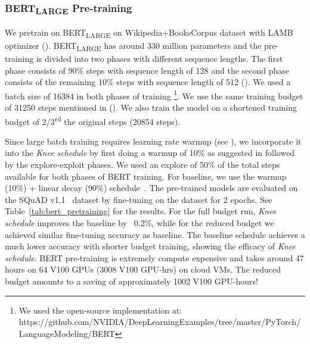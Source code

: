 \documentclass[twoside,11pt]{article}
\newcommand{\lrschedule}{\textit{Knee schedule}}
\begin{document}
\subsubsection{BERT\textsubscript{LARGE} Pre-training}

We pretrain on BERT\textsubscript{LARGE} on  Wikipedia+BooksCorpus dataset with LAMB optimizer (\cite{bert76lamb}).
BERT\textsubscript{LARGE} has around 330 million parameters and the pre-training is divided into two phases with different sequence lengths. The first phase consists of 90\% steps with sequence length of 128 and the second phase consists of the remaining 10\% steps with sequence length of 512 (\cite{devlin2018bert}). We used a batch size of 16384 in both phases of training \footnote{We used the open-source implementation at: \\https://github.com/NVIDIA/DeepLearningExamples/tree/master/PyTorch/LanguageModeling/BERT}. We use the same training budget of 31250 steps  mentioned in (\cite{bert76lamb}). We also train the model on a shortened training budget of 2/3\textsuperscript{rd} the original steps (20854 steps).  

Since large batch training requires learning rate warmup (see \citet{goyal-imagenet-in-an-hour-2017}), we incorporate it into the \lrschedule{} by first doing a warmup of 10\% as suggested in \citep{bert76lamb} followed by the explore-exploit phases. We used an explore of 50\% of the total steps available for both phases of BERT training. For baseline, we use the warmup (10\%) + linear decay (90\%)  schedule~\citep{bert76lamb,devlin2018bert}. The pre-trained models are evaluated on the SQuAD v1.1~\citep{rajpurkar2016squad} dataset by fine-tuning on the dataset for 2 epochs.  See Table~\ref{tab:bert_pretraining} for the results. For the full budget run, \lrschedule{} improves the baseline by ~0.2\%, while for the reduced budget we achieved similar fine-tuning accuracy as baseline. The baseline schedule achieves a much lower accuracy with shorter budget training, showing the efficacy of \lrschedule{}. BERT pre-training is extremely compute expensive and takes around 47 hours on 64 V100 GPUs (3008 V100 GPU-hrs) on cloud VMs. The reduced budget amounts to a saving of approximately 1002 V100 GPU-hours!
\end{document}
